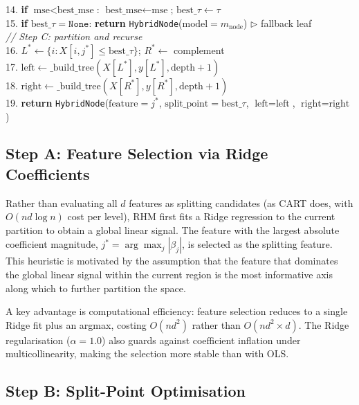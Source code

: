 \documentclass[11pt,a4paper]{article}
\begin{document}
{{14. \quad \textbf{if} $\text{mse} < \text{best\_mse}$: $\text{best\_mse} \leftarrow \text{mse}$;\; $\text{best\_}\tau \leftarrow \tau$\\
15. \textbf{if} $\text{best\_}\tau = \texttt{None}$: \textbf{return} \texttt{HybridNode}($\text{model}\!=\!m_{\text{node}}$) \hfill $\triangleright$ fallback leaf\\[2pt]
\quad \emph{// Step C: partition and recurse}\\
16. $L^* \leftarrow \{i : X[i, j^*] \leq \text{best\_}\tau\}$;\; $R^* \leftarrow$ complement\\
17. $\text{left} \leftarrow \text{\_build\_tree}(X[L^*], y[L^*], \text{depth}+1)$\\
18. $\text{right} \leftarrow \text{\_build\_tree}(X[R^*], y[R^*], \text{depth}+1)$\\
19. \textbf{return} \texttt{HybridNode}($\text{feature}\!=\!j^*$, $\text{split\_point}\!=\!\text{best\_}\tau$, $\text{left}\!=\!\text{left}$, $\text{right}\!=\!\text{right}$)
}}\medskip

\subsection{Step A: Feature Selection via Ridge Coefficients}

Rather than evaluating all $d$ features as splitting candidates (as CART does, with $O(nd \log n)$ cost per level), RHM first fits a Ridge regression to the current partition to obtain a global linear signal. The feature with the largest absolute coefficient magnitude, $j^* = \arg\max_j |\beta_j|$, is selected as the splitting feature. This heuristic is motivated by the assumption that the feature that dominates the global linear signal within the current region is the most informative axis along which to further partition the space.

A key advantage is computational efficiency: feature selection reduces to a single Ridge fit plus an argmax, costing $O(nd^2)$ rather than $O(nd^2 \times d)$. The Ridge regularisation ($\alpha = 1.0$) also guards against coefficient inflation under multicollinearity, making the selection more stable than with OLS.

\subsection{Step B: Split-Point Optimisation}
\end{document}
